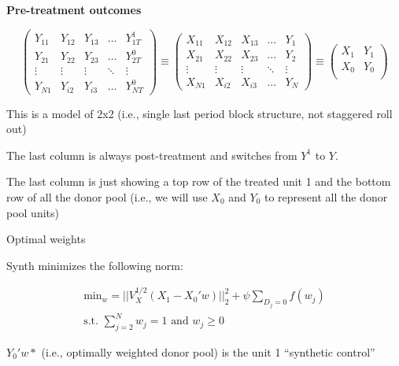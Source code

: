 \documentclass{beamer}
\begin{document}
\begin{frame}[plain,shrink=20]
\begin{center}
\textbf{Pre-treatment outcomes}
\end{center}

\begin{center}
\[ \left( \begin{array}{ccccc}
    Y_{11} & Y_{12} & Y_{13} & \dots  & Y_{1T}^1 \\
    Y_{21} & Y_{22} & Y_{23} & \dots  & Y_{2T}^0  \\
    \vdots & \vdots & \vdots & \ddots & \vdots \\
    Y_{N1} & Y_{i2} & Y_{i3} & \dots  & Y_{NT}^0
\end{array} \right) \equiv
\left( \begin{array}{ccccc}
    X_{11} & X_{12} & X_{13} & \dots  & Y_{1} \\
    X_{21} & X_{22} & X_{23} & \dots  & Y_{2}  \\
    \vdots & \vdots & \vdots & \ddots & \vdots \\
    X_{N1} & X_{i2} & X_{i3} & \dots  & Y_{N}
\end{array} \right) \equiv
\left( \begin{array}{cc}
    X_{1} & Y_{1} \\
    X_{0} & Y_{0}  \\
\end{array} \right)
\]

\end{center}

This is a model of 2x2 (i.e., single last period block structure, not staggered roll out)

\bigskip

The last column is always post-treatment and switches from $Y^1$ to $Y$. 

\bigskip

The last column is just showing a top row of the treated unit 1 and the bottom row of all the donor pool (i.e., we will use $X_0$ and $Y_0$ to represent all the donor pool units)

\end{frame}


\begin{frame}{Optimal weights}

Synth minimizes the following norm:

\begin{eqnarray*}
\textrm{min}_w = || V_X^{1/2} (X_1 - X_0'w) ||_2^2 + \psi \sum_{D_j=0}f(w_j)\\
\textrm{s.t. }\sum_{j=2}^N w_{j} =1 \textrm{ and } w_j \geq 0
\end{eqnarray*}

$Y_0'w*$ (i.e., optimally weighted donor pool) is the unit 1 ``synthetic control'' 

\end{frame}
\end{document}
